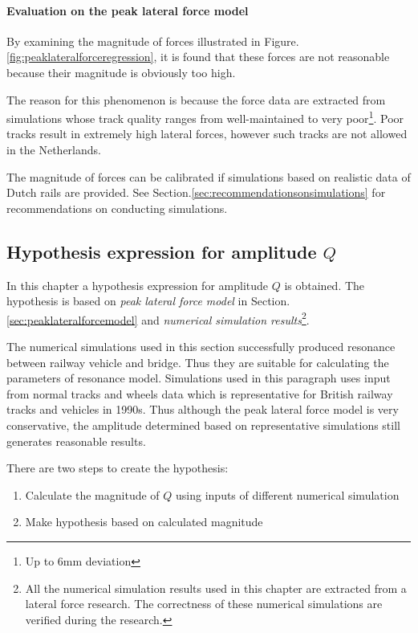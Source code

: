 \paragraph{Evaluation on the peak lateral force model}
By examining the magnitude of forces illustrated in Figure.\ref{fig:peaklateralforceregression}, it is found that these forces are not reasonable because their magnitude is obviously too high.

The reason for this phenomenon is because the force data are extracted from simulations whose track quality ranges from well-maintained to very poor\footnote{Up to 6mm deviation}. Poor tracks result in extremely high lateral forces, however such tracks are not allowed in the Netherlands. 

The magnitude of forces can be calibrated if simulations based on realistic data of Dutch rails are provided. See Section.\ref{sec:recommendationsonsimulations} for recommendations on conducting simulations.


\subsection{Hypothesis expression for amplitude $Q$}

In this chapter a hypothesis expression for amplitude $Q$ is obtained. The hypothesis is based on \emph{peak lateral force model} in Section.\ref{sec:peaklateralforcemodel} and \emph{numerical simulation results}\footnote{All the numerical simulation results used in this chapter are extracted from a lateral force research\citep{d181dt329}. The correctness of these numerical simulations are verified during the research.}. 

The numerical simulations\citep[among Figure.C1,C2,...,C30]{d181dt329} used in this section successfully produced resonance between railway vehicle and bridge. Thus they are suitable for calculating the parameters of resonance model. Simulations used in this paragraph uses input from normal tracks and wheels data which is representative for British railway tracks and vehicles in 1990s. Thus although the peak lateral force model is very conservative, the amplitude determined based on representative simulations still generates reasonable results. 

There are two steps to create the hypothesis:

\begin{enumerate}
	\item Calculate the magnitude of $Q$ using inputs of different numerical simulation
	\item Make hypothesis based on calculated magnitude
\end{enumerate}
	
